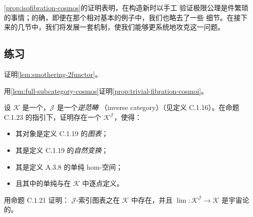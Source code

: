 \cref{prop:isofibration-cosmos}的证明表明，在构造新\trInfinityCosmos{}时以手工
验证极限公理是件繁琐的事情；的确，即便在那个相对基本的例子中，我们也略去了一些
细节。在接下来的几节中，我们将发展一套机制，使我们能够更系统地攻克这一问题。

\subsection*{练习}

\begin{exercise}\label{ex:smothering-2functor}
证明\cref{lem:smothering-2functor}。
\end{exercise}

\begin{exercise}\label{ex:trivial-fibration-cosmoi}
用\cref{lem:full-subcategory-cosmos}证明\cref{prop:trivial-fibration-cosmoi}。
\end{exercise}

\begin{exercise}\label{ex:inverse-reedy-cosmos}
设 $\mathcal{K}$ 是一个\trInfinityCosmos{}，$\mathcal{J}$ 是一个\emph{逆范畴}
（inverse category）（见定义 C.1.16）。在命题 C.1.23 的指引下，证明存在一个%
\trInfinityCosmos{} $\mathcal{K}^{\mathcal{J}}$，使得：
\begin{itemize}
\item 其对象是定义 C.1.19 的\emph{\trFibrant{}图表}；
\item 其\trIsofibration{}是定义 C.1.19 的\emph{\trFibrant{}自然变换}；
\item 其\trFunctorSpace{}是定义 A.3.8 的单纯 hom-空间；
\item 且其中的单纯\trLimit{}与\trEquivalence{}在 $\mathcal{K}$ 中逐点定义。
\end{itemize}
用命题 C.1.21 证明：\trFibrant{} $\mathcal{J}$-索引图表之\trLimit{}在
$\mathcal{K}$ 中存在，并且\trFunctor{}
$\lim\colon\mathcal{K}^{\mathcal{J}}\to\mathcal{K}$ 是宇宙论的。
\end{exercise}
